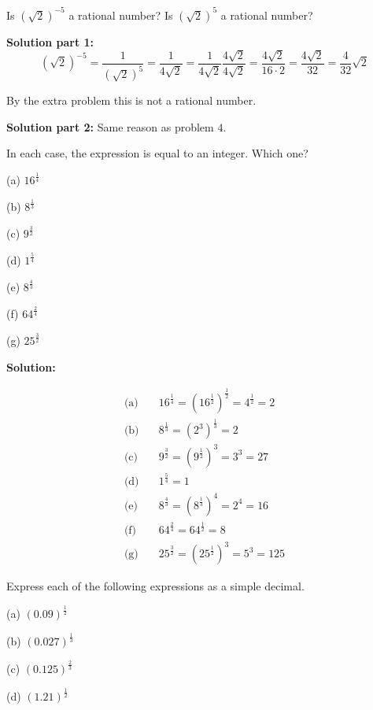 \documentclass[6pt]{article}
\begin{document}
\begin{tcolorbox}[title=Problem 5, breakable]
    Is $(\sqrt{2})^{-5}$ a rational number? Is $(\sqrt{2})^5$ a rational number?
\end{tcolorbox}

\textbf{Solution part 1:}
\[(\sqrt{2})^{-5} 
    = \frac{1}{(\sqrt{2})^5} 
    = \frac{1}{4 \sqrt{2}} 
    = \frac{1}{4 \sqrt{2}} \frac{4 \sqrt{2}}{4 \sqrt{2}} 
    = \frac{4 \sqrt{2}}{16 \cdot 2}
    = \frac{4 \sqrt{2}}{32}
    = \frac{4}{32} \sqrt{2} \]

By the extra problem this is not a rational number.

\textbf{Solution part 2:}
Same reason as problem $4$.

\begin{tcolorbox}[title=Problem 6, breakable]
    In each case, the expression is equal to an integer. Which one?

    (a) $16^{\frac{1}{4}}$

    (b) $8^{\frac{1}{3}}$

    (c) $9^{\frac{3}{2}}$

    (d) $1^{\frac{5}{4}}$

    (e) $8^{\frac{4}{3}}$

    (f) $64^{\frac{2}{4}}$

    (g) $25^{\frac{3}{2}}$
\end{tcolorbox}

\textbf{Solution:}

\begin{align*}
\text{(a)}\quad & 16^{\frac{1}{4}} = (16^{\frac{1}{2}})^{\frac{1}{2}} = 4^{\frac{1}{2}} = 2 \\
\text{(b)}\quad & 8^{\frac{1}{3}} = (2^3)^{\frac{1}{3}} = 2 \\
\text{(c)}\quad & 9^{\frac{3}{2}} = (9^{\frac{1}{2}})^3 = 3^3 = 27 \\
\text{(d)}\quad & 1^{\frac{5}{4}} = 1 \\
\text{(e)}\quad & 8^{\frac{4}{3}} = (8^{\frac{1}{3}})^4 = 2^4 = 16 \\
\text{(f)}\quad & 64^{\frac{2}{4}} = 64^{\frac{1}{2}} = 8 \\
\text{(g)}\quad & 25^{\frac{3}{2}} = (25^{\frac{1}{2}})^3 = 5^3 = 125
\end{align*}

\begin{tcolorbox}[title=Problem 7, breakable]
    Express each of the following expressions as a simple decimal.

    (a) $(0.09)^\frac{1}{2}$

    (b) $(0.027)^\frac{1}{3}$

    (c) $(0.125)^\frac{2}{3}$

    (d) $(1.21)^\frac{1}{2}$
\end{tcolorbox}
\end{document}
